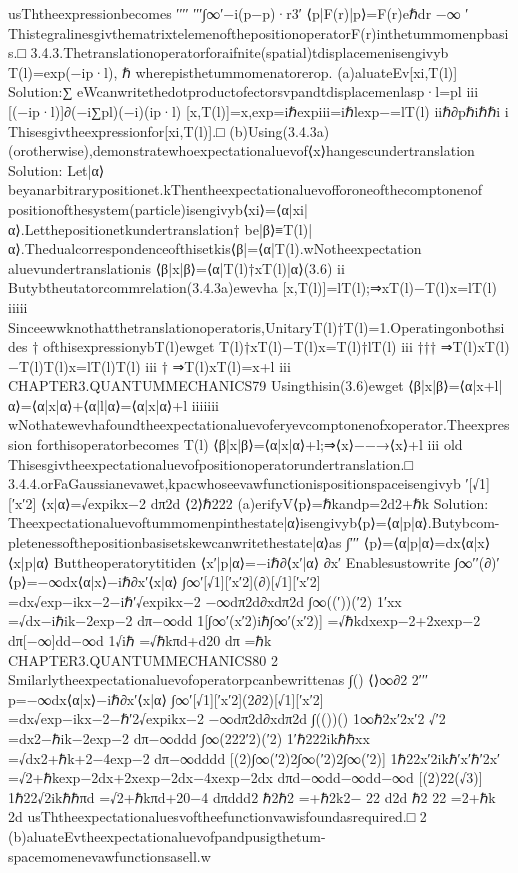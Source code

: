 {{usThtheexpressionbecomes
′′′′
′′′∫∞′−i(p−p)·r3′
⟨p|F(r)|p⟩=F(r)eℏdr
−∞
′
ThistegralinesgivthematrixtelemenofthepositionoperatorF(r)inthetummomenpbasis.□
3.4.3.Thetranslationoperatorforaifnite(spatial)tdisplacemenisengivyb
T(l)=exp(−ip·l),
ℏ
wherepisthetummomenatorerop.
(a)aluateEv[xi,T(l)]
Solution:∑
eWcanwritethedotproductofectorsvpandtdisplacemenlasp·l=pl
iii
[(−ip·l)]∂(−i∑pl)(−i)(ip·l)
[x,T(l)]=x,exp=iℏexpiii=iℏlexp−=lT(l)
iiℏ∂pℏiℏℏi
i
Thisesgivtheexpressionfor[xi,T(l)].□
(b)Using(3.4.3a)(orotherwise),demonstratewhoexpectationaluevof⟨x⟩hangescundertranslation
Solution:
Let|α⟩beyanarbitrarypositionet.kThentheexpectationaluevofforoneofthecomptonenof
positionofthesystem(particle)isengivyb⟨xi⟩=⟨α|xi|α⟩.Letthepositionetkundertranslation†
be|β⟩≡T(l)|α⟩.Thedualcorrespondenceofthisetkis⟨β|=⟨α|T(l).wNotheexpectation
aluevundertranslationis
⟨β|x|β⟩=⟨α|T(l)†xT(l)|α⟩(3.6)
ii
Butybtheutatorcommrelation(3.4.3a)ewevha
[x,T(l)]=lT(l);⇒xT(l)−T(l)x=lT(l)
iiiii
Sinceewwknothatthetranslationoperatoris,UnitaryT(l)†T(l)=1.Operatingonbothsides
†
ofthisexpressionybT(l)ewget
T(l)†{xT(l)−T(l)x}=T(l)†lT(l)
iii
†††
⇒T(l)xT(l)−T(l)T(l)x=lT(l)T(l)
iii
†
⇒T(l)xT(l)=x+l
iii
CHAPTER3.QUANTUMMECHANICS79
Usingthisin(3.6)ewget
⟨β|x|β⟩=⟨α|x+l|α⟩=⟨α|x|α⟩+⟨α|l|α⟩=⟨α|x|α⟩+l
iiiiiii
wNothatewevhafoundtheexpectationaluevoferyevcomptonenofxoperator.Theexpression
forthisoperatorbecomes
T(l)
⟨β|x|β⟩=⟨α|x|α⟩+l;⇒⟨x⟩−−→⟨x⟩+l
iii
old
Thisesgivtheexpectationaluevofpositionoperatorundertranslation.□
3.4.4.orFaGaussianevawet,kpacwhoseevawfunctionispositionspaceisengivyb
′[√1][′x′2]
⟨x|α⟩=√expikx−2
dπ2d
⟨2⟩ℏ222
(a)erifyV⟨p⟩=ℏkandp=2d2+ℏk
Solution:
Theexpectationaluevoftummomenpinthestate|α⟩isengivyb⟨p⟩=⟨α|p|α⟩.Butybcom-
pletenessofthepositionbasisetskewcanwritethestate|α⟩as
∫′′′
⟨p⟩=⟨α|p|α⟩=dx⟨α|x⟩⟨x|p|α⟩
Buttheoperatorytitiden
⟨x′|p|α⟩=−iℏ∂⟨x′|α⟩
∂x′
Enablesustowrite
∫∞′′(∂)′
⟨p⟩=−∞dx⟨α|x⟩−iℏ∂x′⟨x|α⟩
∫∞′[√1][′x′2](∂)[√1][′x′2]
=dx√exp−ikx−2−iℏ′√expikx−2
−∞dπ2d∂xdπ2d
∫∞((′))(′2)
1′xx
=√dx−iℏik−2exp−2
dπ−∞dd
1[∫∞′(x′2)iℏ∫∞′(x′2)]
=√ℏkdxexp−2+2xexp−2
dπ[−∞]dd−∞d
1√iℏ
=√ℏkπd+d20
dπ
=ℏk
CHAPTER3.QUANTUMMECHANICS80
2
Smilarlytheexpectationaluevofoperatorpcanbewrittenas
∫()
⟨⟩∞∂2
2′′′
p=−∞dx⟨α|x⟩−iℏ∂x′⟨x|α⟩
∫∞′[√1][′x′2](2∂2)[√1][′x′2]
=dx√exp−ikx−2−ℏ′2√expikx−2
−∞dπ2d∂xdπ2d
∫(())()
1∞ℏ2x′2x′2
√′2
=dx2−ℏik−2exp−2
dπ−∞ddd
∫∞(222′2)(′2)
1′ℏ222ikℏℏxx
=√dx2+ℏk+2−4exp−2
dπ−∞dddd
[(2)∫∞(′2)2∫∞(′2)2∫∞(′2)]
1ℏ22x′2ikℏ′x′ℏ′2x′
=√2+ℏkexp−2dx+2xexp−2dx−4xexp−2dx
dπd−∞dd−∞dd−∞d
[(2)22(√3)]
1ℏ22√2ikℏℏπd
=√2+ℏkπd+20−4
dπddd2
ℏ2ℏ2
=+ℏ2k2−
22
d2d
ℏ2
22
=2+ℏk
2d
usThtheexpectationaluesvoftheefunctionvawisfoundasrequired.□
2
(b)aluateEvtheexpectationaluevofpandpusigthetum-spacemomenevawfunctionsasell.w
}}

